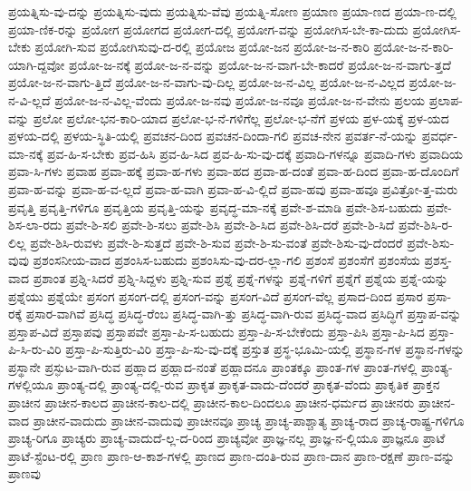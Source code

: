 {ಪ್ರಯತ್ನಿಸು-ವು-ದನ್ನು
ಪ್ರಯತ್ನಿಸು-ವುದು
ಪ್ರಯತ್ನಿಸು-ವೆವು
ಪ್ರಯತ್ನಿ-ಸೋಣ
ಪ್ರಯಾಣ
ಪ್ರಯಾ-ಣದ
ಪ್ರಯಾ-ಣ-ದಲ್ಲಿ
ಪ್ರಯಾ-ಣಿಕ-ರನ್ನು
ಪ್ರಯೋಗ
ಪ್ರಯೋಗದ
ಪ್ರಯೋಗ-ದಲ್ಲಿ
ಪ್ರಯೋಗ-ವನ್ನು
ಪ್ರಯೋಗಿಸ-ಬೇ-ಕಾ-ದುದು
ಪ್ರಯೋಗಿಸ-ಬೇಕು
ಪ್ರಯೋಗಿ-ಸುವ
ಪ್ರಯೋಗಿಸುವು-ದ-ರಲ್ಲಿ
ಪ್ರಯೋಜ
ಪ್ರಯೋ-ಜನ
ಪ್ರಯೋ-ಜ-ನ-ಕಾರಿ
ಪ್ರಯೋ-ಜ-ನ-ಕಾರಿ-ಯಾಗಿ-ದ್ದವೋ
ಪ್ರಯೋ-ಜ-ನಕ್ಕೆ
ಪ್ರಯೋ-ಜ-ನ-ವನ್ನು
ಪ್ರಯೋ-ಜ-ನ-ವಾಗ-ಬೇ-ಕಾದರೆ
ಪ್ರಯೋ-ಜ-ನ-ವಾಗು-ತ್ತದೆ
ಪ್ರಯೋ-ಜ-ನ-ವಾಗು-ತ್ತಿದೆ
ಪ್ರಯೋ-ಜ-ನ-ವಾಗು-ವು-ದಿಲ್ಲ
ಪ್ರಯೋ-ಜ-ನ-ವಿಲ್ಲ
ಪ್ರಯೋ-ಜ-ನ-ವಿಲ್ಲದ
ಪ್ರಯೋ-ಜ-ನ-ವಿ-ಲ್ಲದೆ
ಪ್ರಯೋ-ಜ-ನ-ವಿಲ್ಲ-ವೆಂದು
ಪ್ರಯೋ-ಜ-ನವು
ಪ್ರಯೋ-ಜ-ನವೂ
ಪ್ರಯೋ-ಜ-ನ-ವೇನು
ಪ್ರಲಯ
ಪ್ರಲಾಪ-ವನ್ನು
ಪ್ರಲೋ
ಪ್ರಲೋ-ಭನ-ಕಾರಿ-ಯಾದ
ಪ್ರಲೋ-ಭ-ನೆ-ಗಳಿಗೆಲ್ಲ
ಪ್ರಲೋ-ಭ-ನೆಗೆ
ಪ್ರಳಯ
ಪ್ರಳ-ಯಕ್ಕೆ
ಪ್ರಳ-ಯದ
ಪ್ರಳಯ-ದಲ್ಲಿ
ಪ್ರಳಯ-ಸ್ಥಿತಿ-ಯಲ್ಲಿ
ಪ್ರವಚನ-ದಿಂದ
ಪ್ರವಚನ-ದಿಂದಾ-ಗಲಿ
ಪ್ರವಚ-ನೇನ
ಪ್ರವರ್ತ-ನೆ-ಯನ್ನು
ಪ್ರವರ್ಧ-ಮಾ-ನಕ್ಕೆ
ಪ್ರವ-ಹಿ-ಸ-ಬೇಕು
ಪ್ರವ-ಹಿಸಿ
ಪ್ರವ-ಹಿ-ಸಿದ
ಪ್ರವ-ಹಿ-ಸು-ವು-ದಕ್ಕೆ
ಪ್ರವಾದಿ-ಗಳನ್ನೂ
ಪ್ರವಾದಿ-ಗಳು
ಪ್ರವಾದಿಯ
ಪ್ರವಾ-ಸಿ-ಗಳು
ಪ್ರವಾಹ
ಪ್ರವಾ-ಹಕ್ಕೆ
ಪ್ರವಾ-ಹ-ಗಳು
ಪ್ರವಾ-ಹದ
ಪ್ರವಾ-ಹ-ದಂತೆ
ಪ್ರವಾ-ಹ-ದಿಂದ
ಪ್ರವಾ-ಹ-ದೊಂದಿಗೆ
ಪ್ರವಾ-ಹ-ವನ್ನು
ಪ್ರವಾ-ಹ-ವ-ಲ್ಲದೆ
ಪ್ರವಾ-ಹ-ವಾಗಿ
ಪ್ರವಾ-ಹ-ವಿ-ಲ್ಲಿದೆ
ಪ್ರವಾ-ಹವು
ಪ್ರವಾ-ಹವೂ
ಪ್ರವಿತ್ರೋ-ತ್ತ-ಮರು
ಪ್ರವೃತ್ತಿ
ಪ್ರವೃತ್ತಿ-ಗಳಿಗೂ
ಪ್ರವೃತ್ತಿಯ
ಪ್ರವೃತ್ತಿ-ಯನ್ನು
ಪ್ರವೃದ್ಧ-ಮಾ-ನಕ್ಕೆ
ಪ್ರವೇ-ಶ-ಮಾಡಿ
ಪ್ರವೇ-ಶಿಸ-ಬಹುದು
ಪ್ರವೇ-ಶಿಸ-ಲಾ-ರದು
ಪ್ರವೇ-ಶಿ-ಸಲಿ
ಪ್ರವೇ-ಶಿ-ಸಲು
ಪ್ರವೇ-ಶಿಸಿ
ಪ್ರವೇ-ಶಿ-ಸಿದ
ಪ್ರವೇ-ಶಿಸಿ-ದರೆ
ಪ್ರವೇ-ಶಿ-ಸಿದೆ
ಪ್ರವೇ-ಶಿಸಿ-ರ-ಲಿಲ್ಲ
ಪ್ರವೇ-ಶಿಸಿ-ರುವಳು
ಪ್ರವೇ-ಶಿ-ಸುತ್ತದೆ
ಪ್ರವೇ-ಶಿ-ಸುವ
ಪ್ರವೇ-ಶಿ-ಸು-ವಂತೆ
ಪ್ರವೇ-ಶಿಸು-ವು-ದೆಂದರೆ
ಪ್ರವೇ-ಶಿಸು-ವುವು
ಪ್ರಶಂಸನೀಯ-ವಾದ
ಪ್ರಶಂಸಿಸ-ಬಹುದು
ಪ್ರಶಂಸಿಸು-ವು-ದರ-ಲ್ಲಾ-ಗಲಿ
ಪ್ರಶಂಸೆ
ಪ್ರಶಂಸೆಗೆ
ಪ್ರಶಂಸೆಯ
ಪ್ರಶಸ್ತ-ವಾದ
ಪ್ರಶಾಂತ
ಪ್ರಶ್ನಿ-ಸಿದರೆ
ಪ್ರಶ್ನಿ-ಸಿದ್ದಳು
ಪ್ರಶ್ನಿ-ಸುವ
ಪ್ರಶ್ನೆ
ಪ್ರಶ್ನೆ-ಗಳನ್ನು
ಪ್ರಶ್ನೆ-ಗಳಿಗೆ
ಪ್ರಶ್ನೆಗೆ
ಪ್ರಶ್ನೆಯ
ಪ್ರಶ್ನೆ-ಯನ್ನು
ಪ್ರಶ್ನೆಯು
ಪ್ರಶ್ನೆಯೇ
ಪ್ರಸಂಗ
ಪ್ರಸಂಗ-ದಲ್ಲಿ
ಪ್ರಸಂಗ-ವನ್ನು
ಪ್ರಸಂಗ-ವಿದೆ
ಪ್ರಸಂಗ-ವೆಲ್ಲ
ಪ್ರಸಾದ-ದಿಂದ
ಪ್ರಸಾರ
ಪ್ರಸಾ-ರಕ್ಕೆ
ಪ್ರಸಾರ-ವಾಗಿವೆ
ಪ್ರಸಿದ್ಧ
ಪ್ರಸಿದ್ಧ-ರೆಂಬ
ಪ್ರಸಿದ್ಧ-ವಾಗಿ-ತ್ತು
ಪ್ರಸಿದ್ಧ-ವಾಗಿ-ರುವ
ಪ್ರಸಿದ್ಧ-ವಾದ
ಪ್ರಸಿದ್ಧಿಗೆ
ಪ್ರಸ್ತಾಪ-ವನ್ನು
ಪ್ರಸ್ತಾಪ-ವಿದೆ
ಪ್ರಸ್ತಾಪವು
ಪ್ರಸ್ತಾಪವೇ
ಪ್ರಸ್ತಾ-ಪಿ-ಸ-ಬಹುದು
ಪ್ರಸ್ತಾ-ಪಿ-ಸ-ಬೇಕೆಂದು
ಪ್ರಸ್ತಾ-ಪಿಸಿ
ಪ್ರಸ್ತಾ-ಪಿ-ಸಿದ
ಪ್ರಸ್ತಾ-ಪಿ-ಸಿ-ರು-ವಿರಿ
ಪ್ರಸ್ತಾ-ಪಿ-ಸುತ್ತಿರು-ವಿರಿ
ಪ್ರಸ್ತಾ-ಪಿ-ಸು-ವು-ದಕ್ಕೆ
ಪ್ರಸ್ತುತ
ಪ್ರಸ್ಥ-ಭೂಮಿ-ಯಲ್ಲಿ
ಪ್ರಸ್ಥಾನ-ಗಳ
ಪ್ರಸ್ಥಾನ-ಗಳನ್ನು
ಪ್ರಸ್ಥಾನೇ
ಪ್ರಸ್ಫುಟ-ವಾಗಿ-ರುವ
ಪ್ರಹ್ಲಾದ
ಪ್ರಹ್ಲಾದ-ನಂತೆ
ಪ್ರಹ್ಲಾದನೂ
ಪ್ರಾಂತಕ್ಕೂ
ಪ್ರಾಂತ-ಗಳ
ಪ್ರಾಂತ-ಗಳಲ್ಲಿ
ಪ್ರಾಂತ್ಯ-ಗಳಲ್ಲಿಯೂ
ಪ್ರಾಂತ್ಯ-ದಲ್ಲಿ
ಪ್ರಾಂತ್ಯ-ದಲ್ಲಿ-ರುವ
ಪ್ರಾಕೃತ
ಪ್ರಾಕೃತ-ವಾದು-ದೆಂದರೆ
ಪ್ರಾಕೃತ-ವೆಂದು
ಪ್ರಾಕೃತಿಕ
ಪ್ರಾಕ್ತನ
ಪ್ರಾಚೀನ
ಪ್ರಾಚೀನ-ಕಾಲದ
ಪ್ರಾಚೀನ-ಕಾಲ-ದಲ್ಲಿ
ಪ್ರಾಚೀನ-ಕಾಲ-ದಿಂದಲೂ
ಪ್ರಾಚೀನ-ಧರ್ಮದ
ಪ್ರಾಚೀನರು
ಪ್ರಾಚೀನ-ವಾದ
ಪ್ರಾಚೀನ-ವಾದುದು
ಪ್ರಾಚೀನ-ವಾದುವು
ಪ್ರಾಚೀನವೂ
ಪ್ರಾಚ್ಯ
ಪ್ರಾಚ್ಯ-ಪಾಶ್ಚಾತ್ಯ
ಪ್ರಾಚ್ಯ-ರಾದ
ಪ್ರಾಚ್ಯ-ರಾಷ್ಟ್ರ-ಗಳಿಗೂ
ಪ್ರಾಚ್ಯ-ರಿಗೂ
ಪ್ರಾಚ್ಯರು
ಪ್ರಾಚ್ಯ-ವಾದುದೆ-ಲ್ಲ-ದ-ರಿಂದ
ಪ್ರಾಚ್ಯವೋ
ಪ್ರಾಜ್ಞ-ನಲ್ಲ
ಪ್ರಾಜ್ಞ-ನ-ಲ್ಲಿಯೂ
ಪ್ರಾಜ್ಞನೂ
ಪ್ರಾಟೆ
ಪ್ರಾಟೆ-ಸ್ಟೆಂಟ-ರಲ್ಲಿ
ಪ್ರಾಣ
ಪ್ರಾಣ-ಆ-ಕಾಶ-ಗಳಲ್ಲಿ
ಪ್ರಾಣದ
ಪ್ರಾಣ-ದಂತಿ-ರುವ
ಪ್ರಾಣ-ದಾನ
ಪ್ರಾಣ-ರಕ್ಷಣೆ
ಪ್ರಾಣ-ವನ್ನು
ಪ್ರಾಣವು
}
